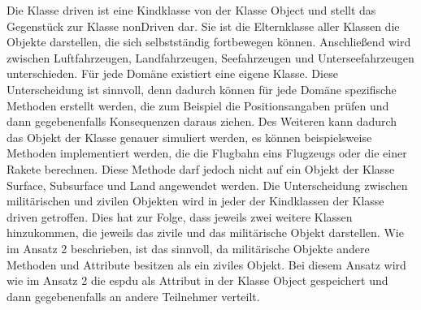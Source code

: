 Die Klasse \glqq driven\grqq{} ist eine Kindklasse von der Klasse  \glqq Object\grqq{} und stellt das Gegenstück zur Klasse \glqq nonDriven\grqq{} dar. Sie ist die Elternklasse aller Klassen die Objekte darstellen, die sich selbstständig fortbewegen können. Anschließend  wird zwischen Luftfahrzeugen, Landfahrzeugen, Seefahrzeugen und Unterseefahrzeugen unterschieden. Für jede Domäne existiert eine eigene Klasse. Diese Unterscheidung ist sinnvoll, denn dadurch können für jede Domäne spezifische Methoden erstellt werden, die zum Beispiel die Positionsangaben prüfen und dann gegebenenfalls Konsequenzen daraus ziehen. Des Weiteren kann dadurch das Objekt der Klasse genauer simuliert werden, es können beispielsweise Methoden implementiert werden, die die Flugbahn eins Flugzeugs oder die einer Rakete berechnen. Diese Methode darf jedoch nicht auf ein Objekt der Klasse \glqq Surface\grqq{}, \glqq Subsurface\grqq{} und \glqq Land\grqq{} angewendet werden. Die  Unterscheidung  zwischen militärischen und zivilen Objekten wird in jeder der Kindklassen  der Klasse \glqq driven\grqq{} getroffen. Dies hat zur Folge, dass jeweils zwei weitere Klassen hinzukommen, die jeweils das zivile und das militärische Objekt darstellen. Wie im Ansatz 2 beschrieben, ist das sinnvoll, da militärische Objekte andere Methoden und Attribute besitzen als ein ziviles Objekt.
Bei diesem Ansatz wird wie im Ansatz 2 die \ac{espdu} als Attribut in der Klasse \glqq Object\grqq{} gespeichert und dann gegebenenfalls an andere Teilnehmer verteilt.\\
